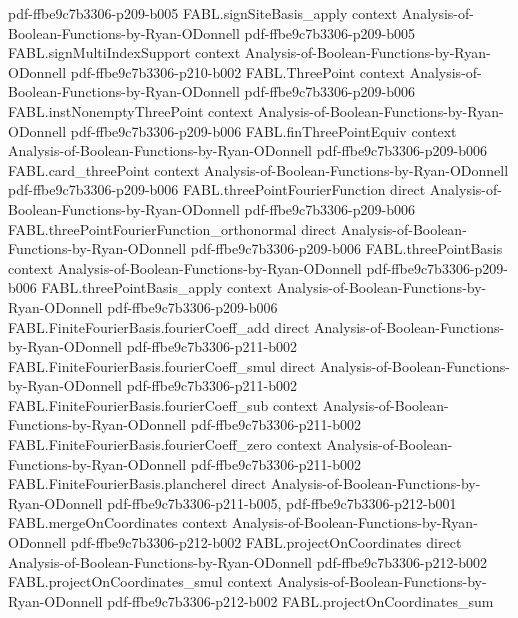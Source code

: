 \begin{theorem}
  {pdf-ffbe9c7b3306-p209-b005}
\proofstep
  {FABL.signSiteBasis_apply}
  {context}
  {Analysis-of-Boolean-Functions-by-Ryan-ODonnell}
  {pdf-ffbe9c7b3306-p209-b005}
\proofstep
  {FABL.signMultiIndexSupport}
  {context}
  {Analysis-of-Boolean-Functions-by-Ryan-ODonnell}
  {pdf-ffbe9c7b3306-p210-b002}
\proofstep
  {FABL.ThreePoint}
  {context}
  {Analysis-of-Boolean-Functions-by-Ryan-ODonnell}
  {pdf-ffbe9c7b3306-p209-b006}
\proofstep
  {FABL.instNonemptyThreePoint}
  {context}
  {Analysis-of-Boolean-Functions-by-Ryan-ODonnell}
  {pdf-ffbe9c7b3306-p209-b006}
\proofstep
  {FABL.finThreePointEquiv}
  {context}
  {Analysis-of-Boolean-Functions-by-Ryan-ODonnell}
  {pdf-ffbe9c7b3306-p209-b006}
\proofstep
  {FABL.card_threePoint}
  {context}
  {Analysis-of-Boolean-Functions-by-Ryan-ODonnell}
  {pdf-ffbe9c7b3306-p209-b006}
\proofstep
  {FABL.threePointFourierFunction}
  {direct}
  {Analysis-of-Boolean-Functions-by-Ryan-ODonnell}
  {pdf-ffbe9c7b3306-p209-b006}
\proofstep
  {FABL.threePointFourierFunction_orthonormal}
  {direct}
  {Analysis-of-Boolean-Functions-by-Ryan-ODonnell}
  {pdf-ffbe9c7b3306-p209-b006}
\proofstep
  {FABL.threePointBasis}
  {context}
  {Analysis-of-Boolean-Functions-by-Ryan-ODonnell}
  {pdf-ffbe9c7b3306-p209-b006}
\proofstep
  {FABL.threePointBasis_apply}
  {context}
  {Analysis-of-Boolean-Functions-by-Ryan-ODonnell}
  {pdf-ffbe9c7b3306-p209-b006}
\proofstep
  {FABL.FiniteFourierBasis.fourierCoeff_add}
  {direct}
  {Analysis-of-Boolean-Functions-by-Ryan-ODonnell}
  {pdf-ffbe9c7b3306-p211-b002}
\proofstep
  {FABL.FiniteFourierBasis.fourierCoeff_smul}
  {direct}
  {Analysis-of-Boolean-Functions-by-Ryan-ODonnell}
  {pdf-ffbe9c7b3306-p211-b002}
\proofstep
  {FABL.FiniteFourierBasis.fourierCoeff_sub}
  {context}
  {Analysis-of-Boolean-Functions-by-Ryan-ODonnell}
  {pdf-ffbe9c7b3306-p211-b002}
\proofstep
  {FABL.FiniteFourierBasis.fourierCoeff_zero}
  {context}
  {Analysis-of-Boolean-Functions-by-Ryan-ODonnell}
  {pdf-ffbe9c7b3306-p211-b002}
\proofstep
  {FABL.FiniteFourierBasis.plancherel}
  {direct}
  {Analysis-of-Boolean-Functions-by-Ryan-ODonnell}
  {pdf-ffbe9c7b3306-p211-b005,
    pdf-ffbe9c7b3306-p212-b001}
\proofstep
  {FABL.mergeOnCoordinates}
  {context}
  {Analysis-of-Boolean-Functions-by-Ryan-ODonnell}
  {pdf-ffbe9c7b3306-p212-b002}
\proofstep
  {FABL.projectOnCoordinates}
  {direct}
  {Analysis-of-Boolean-Functions-by-Ryan-ODonnell}
  {pdf-ffbe9c7b3306-p212-b002}
\proofstep
  {FABL.projectOnCoordinates_smul}
  {context}
  {Analysis-of-Boolean-Functions-by-Ryan-ODonnell}
  {pdf-ffbe9c7b3306-p212-b002}
\proofstep
  {FABL.projectOnCoordinates_sum}

\end{theorem}
